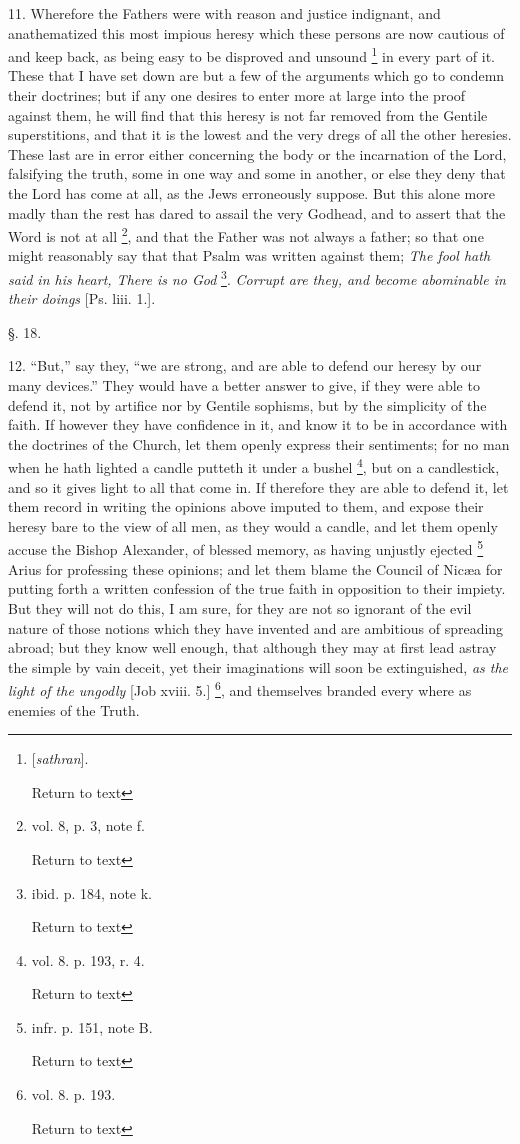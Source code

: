 11. Wherefore the Fathers were with reason and
justice indignant, and anathematized this most impious heresy which
these persons are now cautious of and keep back, as being easy to be
disproved and unsound \footnote{[\emph{sathran}].

Return to text} in every part
of it. These that I have set down are but a few of the arguments which
go to condemn their doctrines; but if any one desires to enter more at
large into the proof against them, he will find that this heresy is
not far removed from the Gentile superstitions, and that it is the
lowest and the very dregs of all the other heresies. These last are in
error either concerning the body or the incarnation of the Lord,
falsifying the truth, some in one way and some in another, or else
they deny that the Lord has come at all, as the Jews erroneously
suppose. But this alone more madly than the rest has dared to assail
the very Godhead, and to assert that the Word is not at all \footnote{vol. 8, p. 3, note f.

Return to text}, and that the Father was not always a father; so that one might
reasonably say that that Psalm was written against them; \emph{The fool
hath said in his heart, There is no God} \footnote{ibid. p. 184, note k.

Return to text}. \emph{Corrupt are they, and become abominable in their doings}
[Ps. liii. 1.].

§. 18.

12. ``But,'' say they, ``we are strong, and are able
to defend our heresy by our many devices.'' They would have a better
answer to give, if they were able to defend it, not by artifice nor by
Gentile sophisms, but by the simplicity of the faith. If however they
have confidence in it, and know it to be in accordance with the
doctrines of the Church, let them openly express their sentiments; for
no man when he hath lighted a candle putteth it under a bushel \footnote{vol. 8. p. 193, r. 4.

Return to text}, but on a candlestick, and so it gives light to all that come in.
If therefore they are able to defend it, let them record in writing
the opinions above imputed to them, and expose their heresy bare to
the view of all men, as they would a candle, and let them openly
accuse the Bishop Alexander, of blessed memory, as having unjustly
ejected \footnote{infr. p. 151, note B.

Return to text} Arius for professing these
opinions; and let them blame the Council of Nicæa for putting
forth a written confession of the true faith in opposition to their
impiety. But they will not do this, I am sure, for they are not so
ignorant of the evil nature of those notions which they have invented
and are ambitious of spreading abroad; but they know well enough, that
although they may at first lead astray the simple by vain deceit, yet
their imaginations will soon be extinguished, \emph{as the light of the
ungodly} [Job xviii. 5.] \footnote{vol. 8. p. 193.

Return to text}, and
themselves branded every where as enemies of the Truth.

